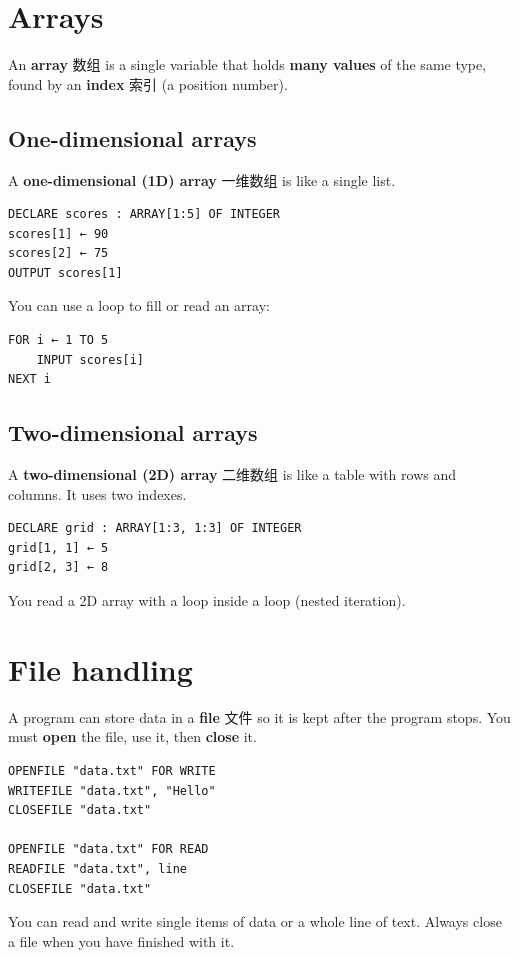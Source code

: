 \documentclass[11pt]{article}
\begin{document}
\section*{Arrays}

An \textbf{array} 数组 is a single variable that holds \textbf{many values} of the same type, found by an \textbf{index} 索引 (a position number).

\subsection*{One-dimensional arrays}

A \textbf{one-dimensional (1D) array} 一维数组 is like a single list.

\begin{Verbatim}
DECLARE scores : ARRAY[1:5] OF INTEGER
scores[1] ← 90
scores[2] ← 75
OUTPUT scores[1]
\end{Verbatim}

You can use a loop to fill or read an array:

\begin{Verbatim}
FOR i ← 1 TO 5
    INPUT scores[i]
NEXT i
\end{Verbatim}

\subsection*{Two-dimensional arrays}

A \textbf{two-dimensional (2D) array} 二维数组 is like a table with rows and columns. It uses two indexes.

\begin{Verbatim}
DECLARE grid : ARRAY[1:3, 1:3] OF INTEGER
grid[1, 1] ← 5
grid[2, 3] ← 8
\end{Verbatim}

You read a 2D array with a loop inside a loop (nested iteration).

\section*{File handling}

A program can store data in a \textbf{file} 文件 so it is kept after the program stops. You must \textbf{open} the file, use it, then \textbf{close} it.

\begin{Verbatim}
OPENFILE "data.txt" FOR WRITE
WRITEFILE "data.txt", "Hello"
CLOSEFILE "data.txt"

OPENFILE "data.txt" FOR READ
READFILE "data.txt", line
CLOSEFILE "data.txt"
\end{Verbatim}

You can read and write single items of data or a whole line of text. Always close a file when you have finished with it.
\end{document}
